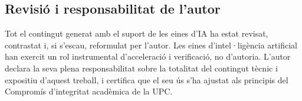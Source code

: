 \subsection*{Revisió i responsabilitat de l'autor}

Tot el contingut generat amb el suport de les eines d'IA ha estat revisat, contrastat i, si s'escau, reformulat per l'autor. Les eines d'intel·ligència artificial han exercit un rol instrumental d'acceleració i verificació, no d'autoria. L'autor declara la seva plena responsabilitat sobre la totalitat del contingut tècnic i expositiu d'aquest treball, i certifica que el seu ús s'ha ajustat als principis del Compromís d'integritat acadèmica de la UPC.
